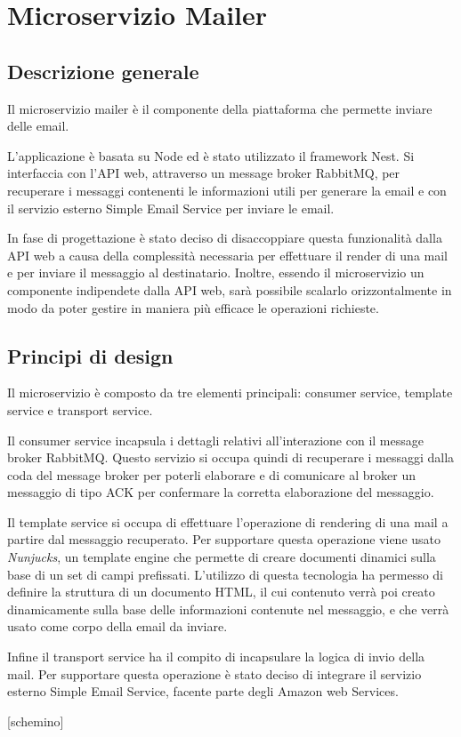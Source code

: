 
\section{Microservizio Mailer}
\subsection{Descrizione generale}
Il microservizio mailer è il componente della piattaforma che permette inviare delle email.

L'applicazione è basata su Node ed è stato utilizzato il framework Nest.
Si interfaccia con l'API web, attraverso un message broker RabbitMQ, per recuperare i messaggi contenenti le informazioni utili per generare la email e con il servizio esterno Simple Email Service per inviare le email.

In fase di progettazione è stato deciso di disaccoppiare questa funzionalità dalla API web a causa della complessità necessaria per effettuare il render di una mail e per inviare il messaggio al destinatario.
Inoltre, essendo il microservizio un componente indipendete dalla API web, sarà possibile scalarlo orizzontalmente in modo da poter gestire in maniera più efficace le operazioni richieste.

\subsection{Principi di design}
Il microservizio è composto da tre elementi principali: consumer service, template service e transport service.

Il consumer service incapsula i dettagli relativi all'interazione con il message broker RabbitMQ. Questo servizio si occupa quindi di recuperare i messaggi dalla coda del message broker per poterli elaborare e di comunicare
al broker un messaggio di tipo ACK per confermare la corretta elaborazione del messaggio.

Il template service si occupa di effettuare l'operazione di rendering di una mail a partire dal messaggio recuperato. Per supportare questa operazione viene usato \textit{Nunjucks}, un template engine che permette di creare documenti dinamici
sulla base di un set di campi prefissati. L'utilizzo di questa tecnologia ha permesso di definire la struttura di un documento HTML, il cui contenuto verrà poi creato dinamicamente sulla base delle informazioni contenute nel messaggio, e che
verrà usato come corpo della email da inviare.

Infine il transport service ha il compito di incapsulare la logica di invio della mail. Per supportare questa operazione è stato deciso di integrare il servizio esterno Simple Email Service, facente parte degli Amazon web Services.

    [schemino]

